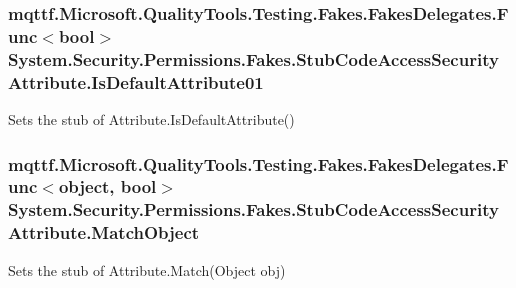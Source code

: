\hypertarget{class_system_1_1_security_1_1_permissions_1_1_fakes_1_1_stub_code_access_security_attribute_aaaac5ebc353e1e67251ac3d558f0854a}{
\subsubsection[{Is\-Default\-Attribute01}]{\setlength{\rightskip}{0pt plus 5cm}mqttf.\-Microsoft.\-Quality\-Tools.\-Testing.\-Fakes.\-Fakes\-Delegates.\-Func$<$bool$>$ System.\-Security.\-Permissions.\-Fakes.\-Stub\-Code\-Access\-Security\-Attribute.\-Is\-Default\-Attribute01}}\label{class_system_1_1_security_1_1_permissions_1_1_fakes_1_1_stub_code_access_security_attribute_aaaac5ebc353e1e67251ac3d558f0854a}


Sets the stub of Attribute.\-Is\-Default\-Attribute()

\hypertarget{class_system_1_1_security_1_1_permissions_1_1_fakes_1_1_stub_code_access_security_attribute_adf6d912eda34837b271e6417e45258a1}{
\subsubsection[{Match\-Object}]{\setlength{\rightskip}{0pt plus 5cm}mqttf.\-Microsoft.\-Quality\-Tools.\-Testing.\-Fakes.\-Fakes\-Delegates.\-Func$<$object, bool$>$ System.\-Security.\-Permissions.\-Fakes.\-Stub\-Code\-Access\-Security\-Attribute.\-Match\-Object}}\label{class_system_1_1_security_1_1_permissions_1_1_fakes_1_1_stub_code_access_security_attribute_adf6d912eda34837b271e6417e45258a1}


Sets the stub of Attribute.\-Match(\-Object obj)

